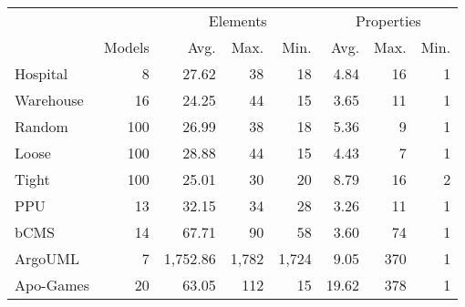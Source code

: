 \begin{tabular}{lrrrrrrr}
\hline
 & & \multicolumn{3}{c}{Elements} & \multicolumn{3}{c}{Properties} \\
& Models & Avg. & Max. & Min. & Avg. & Max. & Min. \\
\hline
\hline
Hospital & 8  & 27.62  & 38  & 18  & 4.84  & 16  & 1  \\
 Warehouse & 16  & 24.25  & 44  & 15  & 3.65  & 11  & 1  \\
 Random & 100  & 26.99  & 38  & 18  & 5.36  & 9  & 1  \\
 Loose & 100  & 28.88  & 44  & 15  & 4.43  & 7  & 1  \\
 Tight & 100  & 25.01  & 30  & 20  & 8.79  & 16  & 2  \\
 \hline
PPU & 13  & 32.15  & 34  & 28  & 3.26  & 11  & 1  \\
 bCMS & 14  & 67.71  & 90  & 58  & 3.60  & 74  & 1  \\
 ArgoUML & 7  & 1,752.86  & 1,782  & 1,724  & 9.05  & 370  & 1  \\
 \hline
Apo-Games & 20  & 63.05  & 112  & 15  & 19.62  & 378  & 1  \\
 \hline
\end{tabular}
